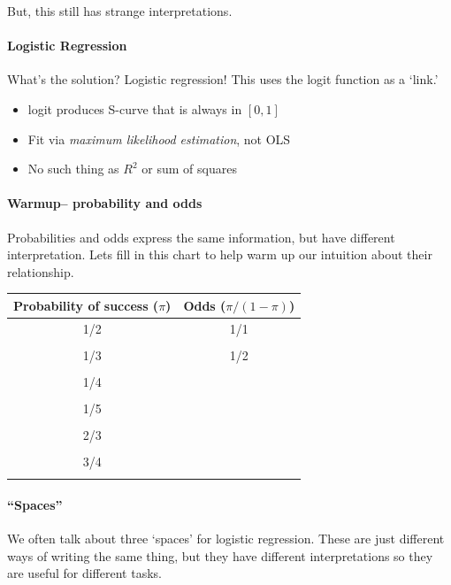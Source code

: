 \documentclass[10pt]{article}\usepackage[]{graphicx}\usepackage[]{color}
\begin{document}
But, this still has strange interpretations. 

\paragraph{Logistic Regression}
What's the solution? Logistic regression! This uses the logit function as a `link.'
	\begin{itemize}
		\item logit produces S-curve that is always in $[0,1]$
		\item Fit via \emph{maximum likelihood estimation}, not OLS
		\item No such thing as $R^2$ or sum of squares
	\end{itemize}

\clearpage
	\paragraph{Warmup-- probability and odds}
Probabilities and odds express the same information, but have different interpretation. Lets fill in this chart to help warm up our intuition about their relationship.
\begin{center}
\begin{tabular}{|c|c|}
\hline
Probability of success ($\pi$) & Odds ($\pi/(1-\pi)$) \\
\hline
1/2 & 1/1 \\
& \\
\hline
1/3 & 1/2 \\
& \\
\hline
1/4 & \\
& \\
\hline 
1/5 & \\
& \\
\hline 
2/3 & \\
& \\
\hline 
3/4 & \\
& \\
\hline
\end{tabular}
\end{center}

\paragraph{``Spaces''}

We often talk about three `spaces' for logistic regression. These are just different ways of writing the same thing, but they have different interpretations so they are useful for different tasks. 
\end{document}
